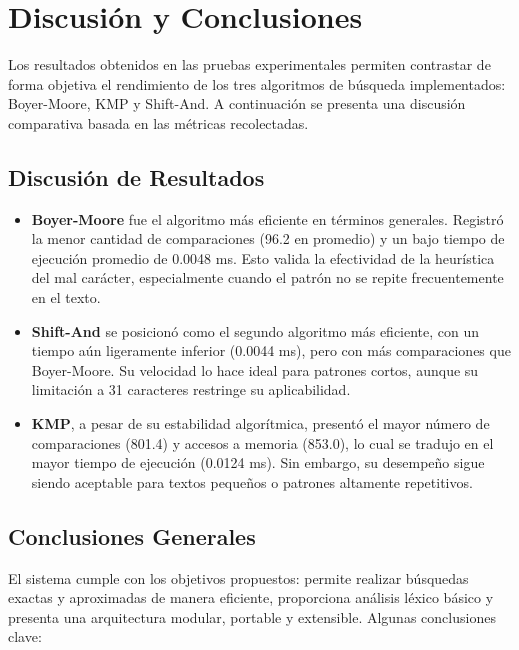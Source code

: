 \documentclass[9pt,letterpaper,onecolumn]{rho-class/rho}
\begin{document}
\section{Discusión y Conclusiones}
\label{sec:conclusiones}

Los resultados obtenidos en las pruebas experimentales permiten contrastar de forma objetiva el rendimiento de los tres algoritmos de búsqueda implementados: Boyer-Moore, KMP y Shift-And. A continuación se presenta una discusión comparativa basada en las métricas recolectadas.

\subsection{Discusión de Resultados}

\begin{itemize}
    \item \textbf{Boyer-Moore} fue el algoritmo más eficiente en términos generales. Registró la menor cantidad de comparaciones (96.2 en promedio) y un bajo tiempo de ejecución promedio de 0.0048 ms. Esto valida la efectividad de la heurística del mal carácter, especialmente cuando el patrón no se repite frecuentemente en el texto.

    \item \textbf{Shift-And} se posicionó como el segundo algoritmo más eficiente, con un tiempo aún ligeramente inferior (0.0044 ms), pero con más comparaciones que Boyer-Moore. Su velocidad lo hace ideal para patrones cortos, aunque su limitación a 31 caracteres restringe su aplicabilidad.

    \item \textbf{KMP}, a pesar de su estabilidad algorítmica, presentó el mayor número de comparaciones (801.4) y accesos a memoria (853.0), lo cual se tradujo en el mayor tiempo de ejecución (0.0124 ms). Sin embargo, su desempeño sigue siendo aceptable para textos pequeños o patrones altamente repetitivos.
\end{itemize}


\subsection{Conclusiones Generales}

El sistema cumple con los objetivos propuestos: permite realizar búsquedas exactas y aproximadas de manera eficiente, proporciona análisis léxico básico y presenta una arquitectura modular, portable y extensible. Algunas conclusiones clave:
\end{document}

